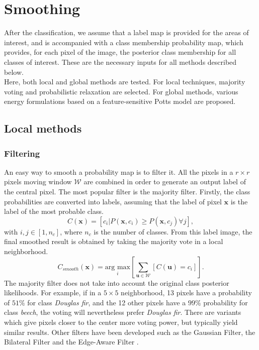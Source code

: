 \section{Smoothing}
After the classification, we assume that a label map is provided for the areas of interest, and is accompanied with a class membership probability map, which provides, for each pixel of the image, the posterior class membership for all classes of interest. These are the necessary inputs for all methods described below. \\
Here, both local and global methods are tested. For local techniques, majority voting and probabilistic relaxation are selected. For global methods, various energy formulations based on a feature-sensitive Potts model are proposed.

\subsection{Local methods}
\subsubsection{Filtering}
An easy way to smooth a probability map is to filter it. All the pixels in a $r \times r$ pixels moving window $\mathcal{W}$ are combined in order to generate an output label of the central pixel. The most popular filter is the majority filter. Firstly, the class probabilities are converted into labels, assuming that the label of pixel $\mathbf{x}$ is the label of the most probable class.\\
\begin{equation}
C(\mathbf{x})=[c_{i}|P(\mathbf{x},c_{i}) \geq P(\mathbf{x},c_{j}) \forall j],
\end{equation}
with $i,j \in [1,n_{c}]$, where $n_{c}$ is the number of classes. From this label image, the final smoothed result is obtained by taking the majority vote in a local neighborhood.
\begin{equation}
C_{smooth}(\mathbf{x})=\underset{i}{\text{arg max}}\left[ \sum_{\mathbf{u}\in\mathcal{W}}\left[C(\mathbf{u})=c_{i}\right] \right].
\end{equation}
The majority filter does not take into account the original class posterior likelihoods. For example, if in a $5 \times 5$ neighborhood, 13 pixels have a probability of $51\%$ for class \textit{Douglas fir}, and the 12 other pixels have a $99\%$ probability for class \textit{beech}, the voting will nevertheless prefer \textit{Douglas fir}. There are variants which give pixels closer to the center more voting power, but typically yield similar results.
Other filters have been developed such as the Gaussian Filter, the Bilateral Filter \citep{paris2006fast, paris2009bilateral} and the Edge-Aware Filter \citep{chen2007real}.

